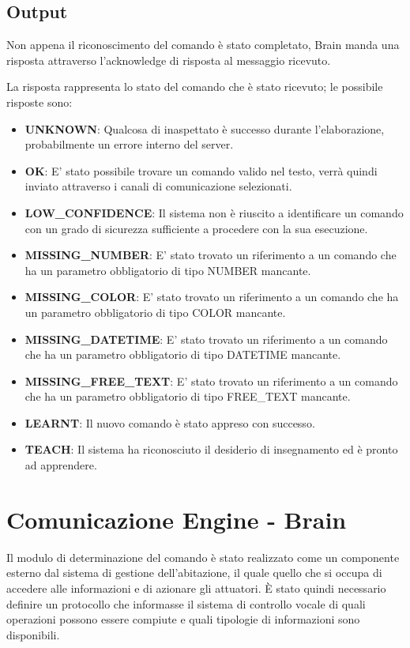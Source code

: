 \documentclass[twoside]{supsistudent}
\begin{document}
\section{Output}
Non appena il riconoscimento del comando è stato completato, Brain manda una risposta attraverso l'acknowledge di risposta al messaggio ricevuto.

La risposta rappresenta lo stato del comando che è stato ricevuto; le possibile risposte sono:
\begin{itemize}
	\item \textbf{UNKNOWN}: Qualcosa di inaspettato è successo durante l'elaborazione, probabilmente un errore interno del server.
	\item \textbf{OK}: E' stato possibile trovare un comando valido nel testo, verrà quindi inviato attraverso i canali di comunicazione selezionati.
	\item \textbf{LOW\_CONFIDENCE}: Il sistema non è riuscito a identificare un comando con un grado di sicurezza sufficiente a procedere con la sua esecuzione.
	\item \textbf{MISSING\_NUMBER}: E' stato trovato un riferimento a un comando che ha un parametro obbligatorio di tipo NUMBER mancante.
	\item \textbf{MISSING\_COLOR}: E' stato trovato un riferimento a un comando che ha un parametro obbligatorio di tipo COLOR mancante.
	\item \textbf{MISSING\_DATETIME}: E' stato trovato un riferimento a un comando che ha un parametro obbligatorio di tipo DATETIME mancante.
	\item \textbf{MISSING\_FREE\_TEXT}: E' stato trovato un riferimento a un comando che ha un parametro obbligatorio di tipo FREE\_TEXT mancante.
	\item \textbf{LEARNT}: Il nuovo comando è stato appreso con successo.
	\item \textbf{TEACH}: Il sistema ha riconosciuto il desiderio di insegnamento ed è pronto ad apprendere.
\end{itemize}

\chapter{Comunicazione Engine - Brain }
Il modulo di determinazione del comando è stato realizzato come un componente esterno dal sistema di gestione dell'abitazione, il quale quello che si occupa di accedere alle informazioni e di azionare gli attuatori. È stato quindi necessario definire un protocollo che informasse il sistema di controllo vocale di quali operazioni possono essere compiute e quali tipologie di informazioni sono disponibili.
\end{document}
